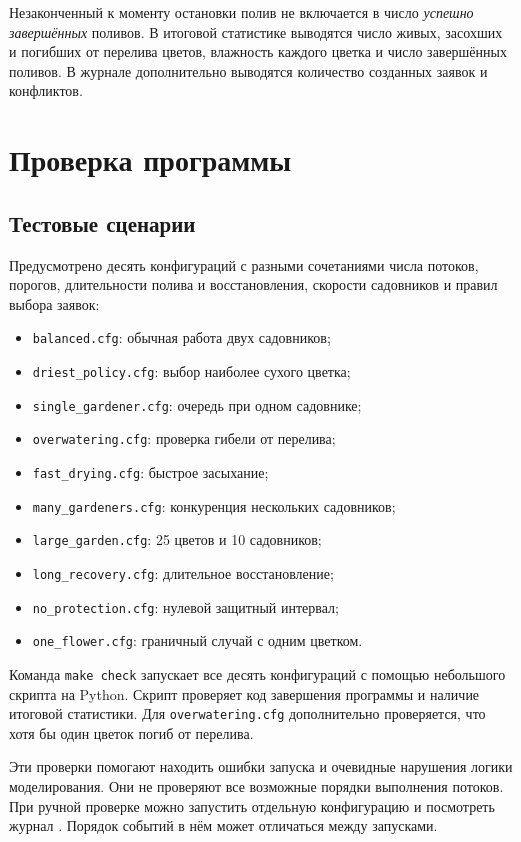 \documentclass[12pt,a4paper]{article}
\begin{document}
Незаконченный к моменту остановки полив не включается в число
\emph{успешно завершённых} поливов. В итоговой статистике выводятся
число живых, засохших и погибших от перелива цветов, влажность
каждого цветка и число завершённых поливов. В журнале дополнительно
выводятся количество созданных заявок и конфликтов.

\section{Проверка программы}

\subsection{Тестовые сценарии}

Предусмотрено десять конфигураций с разными сочетаниями числа потоков,
порогов, длительности полива и восстановления, скорости садовников и
правил выбора заявок:
\begin{itemize}[noitemsep]
\item \texttt{balanced.cfg}: обычная работа двух садовников;
\item \texttt{driest\_policy.cfg}: выбор наиболее сухого цветка;
\item \texttt{single\_gardener.cfg}: очередь при одном садовнике;
\item \texttt{overwatering.cfg}: проверка гибели от перелива;
\item \texttt{fast\_drying.cfg}: быстрое засыхание;
\item \texttt{many\_gardeners.cfg}: конкуренция нескольких садовников;
\item \texttt{large\_garden.cfg}: 25 цветов и 10 садовников;
\item \texttt{long\_recovery.cfg}: длительное восстановление;
\item \texttt{no\_protection.cfg}: нулевой защитный интервал;
\item \texttt{one\_flower.cfg}: граничный случай с одним цветком.
\end{itemize}

Команда \texttt{make check} запускает все десять конфигураций с помощью
небольшого скрипта на Python. Скрипт проверяет код завершения программы
и наличие итоговой статистики. Для \texttt{overwatering.cfg} дополнительно
проверяется, что хотя бы один цветок погиб от перелива.

Эти проверки помогают находить ошибки запуска и очевидные нарушения
логики моделирования. Они не проверяют все возможные порядки выполнения
потоков. При ручной проверке можно запустить отдельную конфигурацию и
посмотреть журнал . Порядок событий в нём
может отличаться между запусками.
\end{document}
